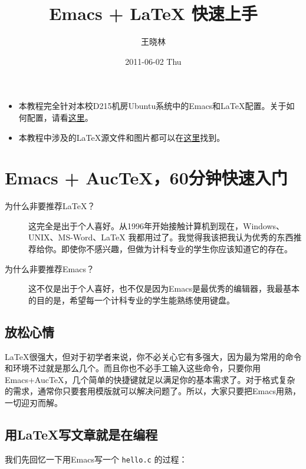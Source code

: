 \documentclass[12pt,a4paper]{article}
\title{Emacs + \LaTeX{} 快速上手}
\author{王晓林}
\date{2011-06-02 Thu}
\begin{document}
\maketitle

\setcounter{tocdepth}{3}
\tableofcontents
\vspace*{1cm}


\begin{itemize}
\item 本教程完全针对本校D215机房Ubuntu系统中的Emacs和\LaTeX{}配置。关于如何配置，请看\href{http://cs3.swfc.edu.cn/~wx672/lecture_notes/linux/install.html}{这里}。
\item 本教程中涉及的\LaTeX{}源文件和图片都可以在\href{file:///home/wx672/git/lecture_notes/linux/tutorials/latex/}{这里}找到。
\end{itemize}
\section{Emacs + AucTeX，60分钟快速入门}
\label{sec-1}


\begin{description}
\item[为什么非要推荐\LaTeX{}？] 这完全是出于个人喜好。从1996年开始接触计算机到现在，Windows、UNIX、MS-Word、\LaTeX{} 我都用过了。我觉得我该把我认为优秀的东西推荐给你。即使你不感兴趣，但做为计科专业的学生你应该知道它的存在。
\item[为什么非要推荐Emacs？] 这不仅是出于个人喜好，也不仅是因为Emacs是最优秀的编辑器，我最基本的目的是，希望每一个计科专业的学生能熟练使用键盘。
\end{description}
\subsection{放松心情}
\label{sec-1_1}

   \LaTeX{}很强大，但对于初学者来说，你不必关心它有多强大，因为最为常用的命令和环境不过就是那么几个。而且你也不必手工输入这些命令，只要你用Emacs+AucTeX，几个简单的快捷键就足以满足你的基本需求了。对于格式复杂的需求，通常你只要套用模版就可以解决问题了。所以，大家只要把Emacs用熟，一切迎刃而解。
\subsection{用\LaTeX{}写文章就是在编程}
\label{sec-1_2}

  我们先回忆一下用Emacs写一个 \texttt{hello.c} 的过程：
\end{document}
